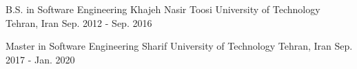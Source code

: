 

\begin{cventries}

  	\cventry
    {B.S. in Software Engineering} %
    {Khajeh Nasir Toosi University of Technology} %
    {Tehran, Iran} %
    {Sep. 2012 - Sep. 2016} %
    {
    	\begin{cvitems} %
    	\end{cvitems}
    }



	\cventry
	{Master in Software Engineering} %
	{Sharif University of Technology} %
	{Tehran, Iran} %
	{Sep. 2017 - Jan. 2020} %
	{
		\begin{cvitems} %
		\end{cvitems}
	}

\end{cventries}
